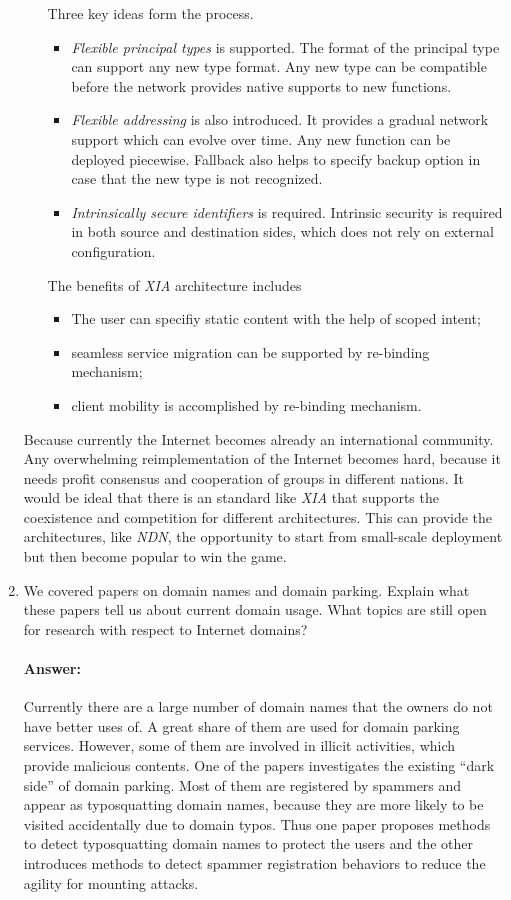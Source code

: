 \documentclass[a4paper,11pt]{article}
\theoremstyle{mytheor}
\begin{document}
\begin{enumerate}
\begin{itemize}
Three key ideas form the process.
\begin{itemize}
\item \emph{Flexible principal types} is supported. 
The format of the principal type can support any new type format.
Any new type can be compatible before the network provides native supports to new functions.
\item \emph{Flexible addressing} is also introduced.
It provides a gradual network support which can evolve over time.
Any new function can be deployed piecewise.
Fallback also helps to specify backup option in case that the new type is not recognized.
\item \emph{Intrinsically secure identifiers} is required. 
Intrinsic security is required in both source and destination sides, which does not rely on external configuration. 
\end{itemize}
The benefits of \emph{XIA} architecture includes
\begin{itemize}
	\item The user can specifiy static content with the help of scoped intent;
	\item seamless service migration can be supported by re-binding mechanism;
	\item client mobility is accomplished by re-binding mechanism.
\end{itemize}
\end{itemize}

Because currently the Internet becomes already an international community.
Any overwhelming reimplementation of the Internet becomes hard, because it needs profit consensus and cooperation of groups in different nations.
It would be ideal that there is an standard like \emph{XIA} that supports the coexistence and competition for different architectures.
This can provide the architectures, like \emph{NDN}, the opportunity to start from small-scale deployment but then become popular to win the game.

\item 
We covered papers on domain names and domain parking. 
Explain what these papers tell us about current domain usage. 
What topics are still open for research with respect to Internet domains?
\paragraph{Answer:}
Currently there are a large number of domain names that the owners do not have better uses of.
A great share of them are used for domain parking services.
However, some of them are involved in illicit activities, which provide malicious contents.
One of the papers investigates the existing ``dark side'' of domain parking.
Most of them are registered by spammers and appear as typosquatting domain names, because they are more likely to be visited accidentally due to domain typos.
Thus one paper proposes methods to detect typosquatting domain names to protect the users and the other introduces methods to detect spammer registration behaviors to reduce the agility for mounting attacks.


\end{enumerate}
\end{document}
